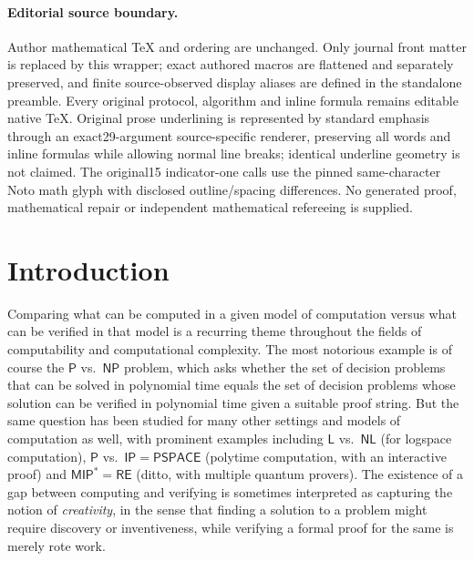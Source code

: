 \documentclass[11pt]{article}
\numberwithin{equation}{section}
\theoremstyle{definition}
\theoremstyle{plain}
\theoremstyle{definition}\newtheorem{notation}[theorem]{Notation}\theoremstyle{plain}\raggedbottom
\newcommand{\1}{\mathds{1}}
\begin{document}
\paragraph{Editorial source boundary.}
Author mathematical TeX and ordering are unchanged. Only journal front matter is replaced by this wrapper; exact authored macros are flattened and separately preserved, and finite source-observed display aliases are defined in the standalone preamble. Every original protocol, algorithm and inline formula remains editable native TeX. Original prose underlining is represented by standard emphasis through an exact29-argument source-specific renderer, preserving all words and inline formulas while allowing normal line breaks; identical underline geometry is not claimed. The original15 indicator-one calls use the pinned same-character Noto math glyph with disclosed outline/spacing differences.  No generated proof, mathematical repair or independent mathematical refereeing is supplied. 
\clearpage
\enlargethispage{2pt}

%
%
%

\section{Introduction}

Comparing what can be computed in a given model of computation versus what can be verified in that model is a recurring theme throughout the fields of computability and computational complexity. The most notorious example is of course the $\mathsf{P}$ vs.\ $\mathsf{NP}$ problem, which asks whether the set of decision problems that can be solved in polynomial time equals the set of decision problems whose solution can be verified in polynomial time given a suitable proof string. But the same question has been studied for many other settings and models of computation as well, with prominent examples including $\mathsf{L}$ vs.\ $\mathsf{NL}$ (for logspace computation), $\mathsf{P}$ vs.\ $\mathsf{IP} = \mathsf{PSPACE}$ (polytime computation, with an interactive proof) and $\mathsf{MIP}^* = \mathsf{RE}$ (ditto, with multiple quantum provers). The existence of a gap between computing and verifying is sometimes interpreted as capturing the notion of \emph{creativity}, in the sense that finding a solution to a problem might require discovery or inventiveness, while verifying a formal proof for the same is merely rote work.
\end{document}
